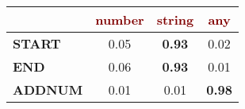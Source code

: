 \renewcommand{\arraystretch}{0.5}
\scriptsize
\begin{tabular}{@{}l c@{\hskip 1mm} c@{\hskip 1mm} c@{}}
\toprule
& \textbf{\textcolor{Maroon}{number}} & \textbf{\textcolor{Maroon}{string}} & \textbf{\textcolor{Maroon}{any}}\\ 
\midrule
\textbf{\textcolor{mygreen}{START}} & 0.05 & \textbf{0.93} & 0.02\\
\textbf{\textcolor{mygreen}{END}} & 0.06 & \textbf{0.93} & 0.01\\
\textbf{\textcolor{mygreen}{ADDNUM}} & 0.01 & 0.01 & \textbf{0.98}\\
\bottomrule
\end{tabular}
